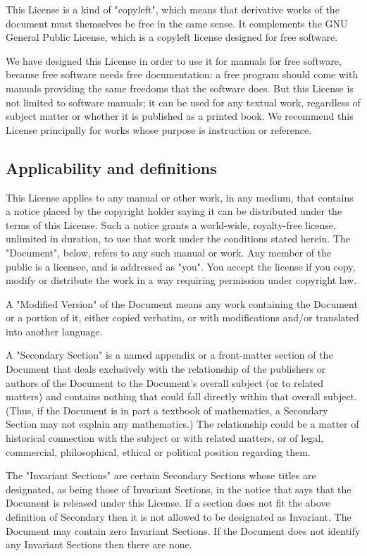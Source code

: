 \documentclass[11pt]{article}
\begin{document}
This License is a kind of "copyleft", which means that derivative
works of the document must themselves be free in the same sense.  It
complements the GNU General Public License, which is a copyleft
license designed for free software.

We have designed this License in order to use it for manuals for free
software, because free software needs free documentation: a free
program should come with manuals providing the same freedoms that the
software does.  But this License is not limited to software manuals;
it can be used for any textual work, regardless of subject matter or
whether it is published as a printed book.  We recommend this License
principally for works whose purpose is instruction or reference.


\subsection*{Applicability and definitions}
\label{sec:appl-defin}

This License applies to any manual or other work, in any medium, that
contains a notice placed by the copyright holder saying it can be
distributed under the terms of this License.  Such a notice grants a
world-wide, royalty-free license, unlimited in duration, to use that
work under the conditions stated herein.  The "Document", below,
refers to any such manual or work.  Any member of the public is a
licensee, and is addressed as "you".  You accept the license if you
copy, modify or distribute the work in a way requiring permission
under copyright law.

A "Modified Version" of the Document means any work containing the
Document or a portion of it, either copied verbatim, or with
modifications and/or translated into another language.

A "Secondary Section" is a named appendix or a front-matter section of
the Document that deals exclusively with the relationship of the
publishers or authors of the Document to the Document's overall subject
(or to related matters) and contains nothing that could fall directly
within that overall subject.  (Thus, if the Document is in part a
textbook of mathematics, a Secondary Section may not explain any
mathematics.)  The relationship could be a matter of historical
connection with the subject or with related matters, or of legal,
commercial, philosophical, ethical or political position regarding
them.

The "Invariant Sections" are certain Secondary Sections whose titles
are designated, as being those of Invariant Sections, in the notice
that says that the Document is released under this License.  If a
section does not fit the above definition of Secondary then it is not
allowed to be designated as Invariant.  The Document may contain zero
Invariant Sections.  If the Document does not identify any Invariant
Sections then there are none.
\end{document}
